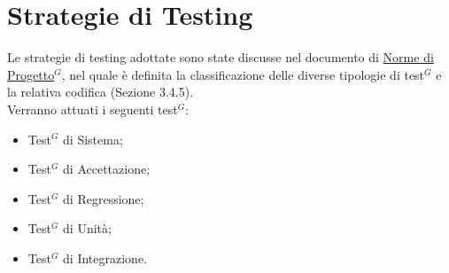 \section{Strategie di Testing}
Le strategie di testing adottate sono state discusse nel documento di \href{https://nullpointersgroup.github.io/Documentazione/output/PB/Documenti%20Interni/Norme_di_Progetto.pdf}{Norme di Progetto$^G$}, nel quale è definita la classificazione delle diverse tipologie di test$^G$ e la relativa codifica (Sezione 3.4.5).\\
Verranno attuati i seguenti test$^G$:
\begin{itemize}
    \item Test$^G$ di Sistema;
    \item Test$^G$ di Accettazione;
    \item Test$^G$ di Regressione;
    \item Test$^G$ di Unità;
    \item Test$^G$ di Integrazione.
\end{itemize}
